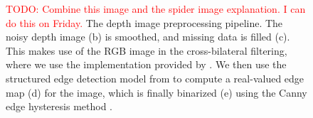 \documentclass[10pt,twocolumn,letterpaper]{article}
\newcommand{\todo}[1]{\textcolor{red}{TODO: #1}}
\begin{document}
\begin{figure}[tb]
        \hfill
        \hfill
    \caption{
    \todo{Combine this image and the spider image explanation. I can do this on Friday.}
    The depth image preprocessing pipeline.
    The noisy depth image (b) is smoothed, and missing data is filled (c). 
    This makes use of the RGB image in the cross-bilateral filtering, where we use the implementation provided by \cite{silberman-eccv-2012}.
    We then use the structured edge detection model from \cite{dollar-iccv-2013} to compute a real-valued edge map (d) for the image, which is finally binarized (e) using the Canny edge hysteresis method \cite{canny-pami-1986}.
    }%
    \label{fig:preprocessing}
\end{figure}
\end{document}
